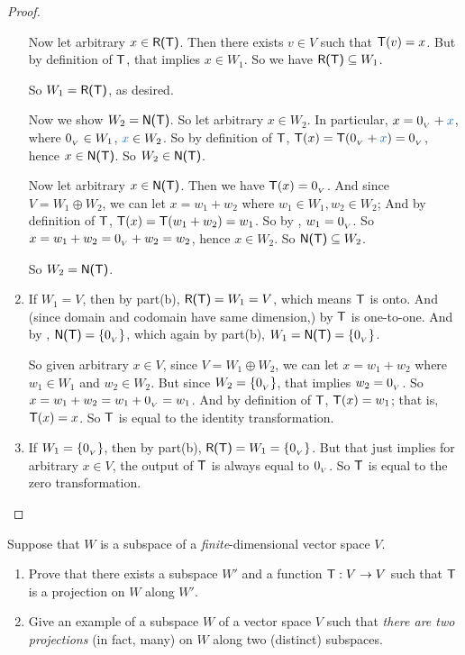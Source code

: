 \begin{proof}
\begin{enumerate}
Now let arbitrary \(x \in \textsf{R(T)}\).
Then there exists \(v \in V\) such that \(\textsf{T}(v) = x\).
But by definition of \(\textsf{T}\), that implies \(x \in W_1\).
So we have \(\textsf{R(T)} \subseteq W_1\).

So \(W_1 = \textsf{R(T)}\), as desired.

Now we show \(W_2 = \textsf{N(T)}\).
So let arbitrary \(x \in W_2\).
In particular, \(x = \OV + \BLUE{x}\), where \(0_{_V} \in W_1\), \(\BLUE{x} \in W_2\).
So by definition of \(\textsf{T}\), \(\T(x) = \T(\OV + \BLUE{x}) = \OV\), hence \(x \in \textsf{N(T)}\).
So \(W_2 \in \textsf{N(T)}\).

Now let arbitrary \(x \in \textsf{N(T)}\).
Then we have \(\textsf{T}(x) = 0_{_V}\). 
And since \(V = W_1 \oplus W_2\), we can let \(x = w_1 + w_2\) where \(w_1 \in W_1, w_2 \in W_2\);
And by definition of \(\textsf{T}\), \(\textsf{T}(x) = \textsf{T}(w_1 + w_2) = w_1\).
So by , \(w_1 = 0_{_V}\).
So \(x = w_1 + w_2 = 0_{_V} + w_2 = w_2\), hence \(x \in W_2\).
So \(\textsf{N(T)} \subseteq W_2\).

So \(W_2 = \textsf{N(T)}\).

\item
If \(W_1 = V\), then by part(b), \(\textsf{R(T)} = W_1 = V\), which means \(\textsf{T}\) is onto.
And (since domain and codomain have same dimension,) by  \(\textsf{T}\) is one-to-one.
And by , \(\textsf{N(T)} = \{ 0_{_V} \}\), which again by part(b), \(W_1 = \textsf{N(T)} = \{ 0_{_V} \}\).

So given arbitrary \(x \in V\), since \(V = W_1 \oplus W_2\), we can let \(x = w_1 + w_2\) where \(w_1 \in W_1\) and \(w_2 \in W_2\).
But since \(W_2 = \{ 0_{_V} \}\), that implies \(w_2 = 0_{_V}\).
So \(x = w_1 + w_2 = w_1 + 0_{_V} = w_1\).
And by definition of \(\textsf{T}\), \(\textsf{T}(x) = w_1\);
that is, \(\textsf{T}(x) = x\).
So \(\textsf{T}\) is equal to the identity transformation.

\item
If \(W_1 = \{ 0_{_V} \}\), then by part(b), \(\textsf{R(T)} = W_1 = \{ 0_{_V} \}\).
But that just implies for arbitrary \(x \in V\), the output of \(\textsf{T}\) is always equal to \(0_{_V}\).
So \(\textsf{T}\) is equal to the zero transformation.
\end{enumerate}
\end{proof}

\begin{exercise} \label{exercise 2.1.28}
Suppose that \(W\) is a subspace of a \emph{finite}-dimensional vector space \(V\).
\begin{enumerate}
\item Prove that there exists a subspace \(W'\) and a function \(\textsf{T} : V \to V\) such that \(\textsf{T}\) is a projection on \(W\) along \(W'\).
\item Give an example of a subspace \(W\) of a vector space \(V\) such that \emph{there are two projections} (in fact, many) on \(W\) along two (distinct) subspaces.
\end{enumerate}
\end{exercise}

